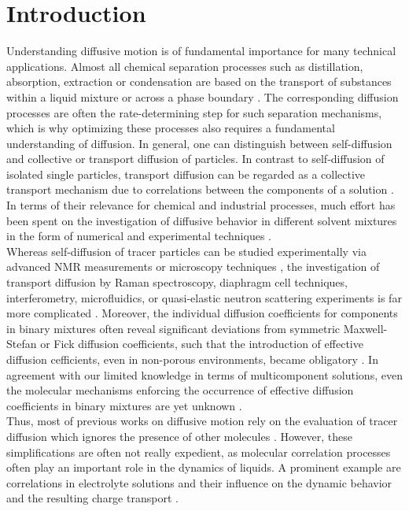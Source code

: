 \documentclass[aip,jcp,reprint]{revtex4-1}
\begin{document}
\section{Introduction}
Understanding diffusive motion is of fundamental importance for many technical applications. Almost all chemical separation processes such as distillation, absorption, extraction or condensation are based on the transport of substances within a liquid mixture or across a phase boundary \cite{seader06a,wankat22a}. The corresponding diffusion processes are often the rate-determining step for such separation mechanisms, which is why optimizing these processes also requires a fundamental understanding of diffusion. 
In general, one can distinguish between self-diffusion  and collective  or transport diffusion of  particles. 
In contrast to self-diffusion of isolated single particles,  transport diffusion can be regarded as a collective transport mechanism due to correlations between the components of a solution \cite{taylor93a,bird04a,newman12a,groot13a,liu13a,guevara16a,janzen17a}. 
In terms of their relevance for chemical and industrial processes, much effort has been spent on the investigation of diffusive behavior in different solvent mixtures \cite{maxwell67a,bird04a,newman12a, groot13a} in the form of numerical and experimental techniques \cite{kincaid83a,derlacki85a,vink85a,trullas93a,vergara01a, keffer05a,rehfeldt07a,krishna08a,krishna09a,rehfeldt10a,liu11a,moggridge12a,liu13a,parez13a,zhu15a,bardow15a,guevara16a,janzen17a}.\\
Whereas self-diffusion of tracer particles can be studied experimentally via advanced NMR measurements or microscopy techniques \cite{kashyap11a},  the investigation of transport diffusion by  Raman
spectroscopy, diaphragm cell techniques, interferometry,
microfluidics, or quasi-elastic neutron scattering experiments is far more complicated \cite{liu13a,taylor93a}. 
Moreover, the individual diffusion coefficients for components in binary mixtures  often reveal significant deviations from symmetric Maxwell-Stefan or Fick diffusion coefficients, such that the introduction of effective diffusion cefficients, even in non-porous environments, became obligatory \cite{taylor93a}.  In agreement with our limited knowledge in terms of multicomponent solutions, even the molecular mechanisms enforcing the occurrence of effective diffusion coefficients in binary mixtures are yet unknown \cite{taylor93a}. \\
Thus, most of previous works on diffusive motion rely on the evaluation of tracer diffusion which ignores the presence of other molecules  \cite{liu13a}.  However, these simplifications are often not really expedient, as molecular correlation processes often play an important role in the dynamics of liquids. A prominent example are correlations in electrolyte solutions  and their influence on the dynamic behavior and the resulting charge transport \cite{kashyap11a,smiatek18a}.
\end{document}
